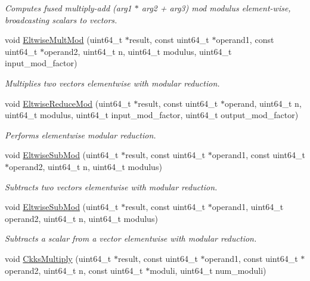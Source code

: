 \begin{DoxyCompactItemize}
\begin{DoxyCompactList}\small\item\em Computes fused multiply-\/add ({\ttfamily arg1} $\ast$ {\ttfamily arg2} + {\ttfamily arg3}) mod {\ttfamily modulus} element-\/wise, broadcasting scalars to vectors. \end{DoxyCompactList}\item 
void \hyperlink{namespaceintel_1_1hexl_a705bc0321d937ae4d1f8d50279e3cff1}{Eltwise\+Mult\+Mod} (uint64\+\_\+t $\ast$result, const uint64\+\_\+t $\ast$operand1, const uint64\+\_\+t $\ast$operand2, uint64\+\_\+t n, uint64\+\_\+t modulus, uint64\+\_\+t input\+\_\+mod\+\_\+factor)
\begin{DoxyCompactList}\small\item\em Multiplies two vectors elementwise with modular reduction. \end{DoxyCompactList}\item 
void \hyperlink{namespaceintel_1_1hexl_af3ddae165283841d495a322275baf5ee}{Eltwise\+Reduce\+Mod} (uint64\+\_\+t $\ast$result, const uint64\+\_\+t $\ast$operand, uint64\+\_\+t n, uint64\+\_\+t modulus, uint64\+\_\+t input\+\_\+mod\+\_\+factor, uint64\+\_\+t output\+\_\+mod\+\_\+factor)
\begin{DoxyCompactList}\small\item\em Performs elementwise modular reduction. \end{DoxyCompactList}\item 
void \hyperlink{namespaceintel_1_1hexl_a6a45c30bc21b9b1e1410b23fce5424c8}{Eltwise\+Sub\+Mod} (uint64\+\_\+t $\ast$result, const uint64\+\_\+t $\ast$operand1, const uint64\+\_\+t $\ast$operand2, uint64\+\_\+t n, uint64\+\_\+t modulus)
\begin{DoxyCompactList}\small\item\em Subtracts two vectors elementwise with modular reduction. \end{DoxyCompactList}\item 
void \hyperlink{namespaceintel_1_1hexl_abc13b8f383d3af6471a5261ee2213b40}{Eltwise\+Sub\+Mod} (uint64\+\_\+t $\ast$result, const uint64\+\_\+t $\ast$operand1, uint64\+\_\+t operand2, uint64\+\_\+t n, uint64\+\_\+t modulus)
\begin{DoxyCompactList}\small\item\em Subtracts a scalar from a vector elementwise with modular reduction. \end{DoxyCompactList}\item 
void \hyperlink{namespaceintel_1_1hexl_a287608abb254a6f0eeb3c7ca95e85a71}{Ckks\+Multiply} (uint64\+\_\+t $\ast$result, const uint64\+\_\+t $\ast$operand1, const uint64\+\_\+t $\ast$operand2, uint64\+\_\+t n, const uint64\+\_\+t $\ast$moduli, uint64\+\_\+t num\+\_\+moduli)

\end{DoxyCompactItemize}
